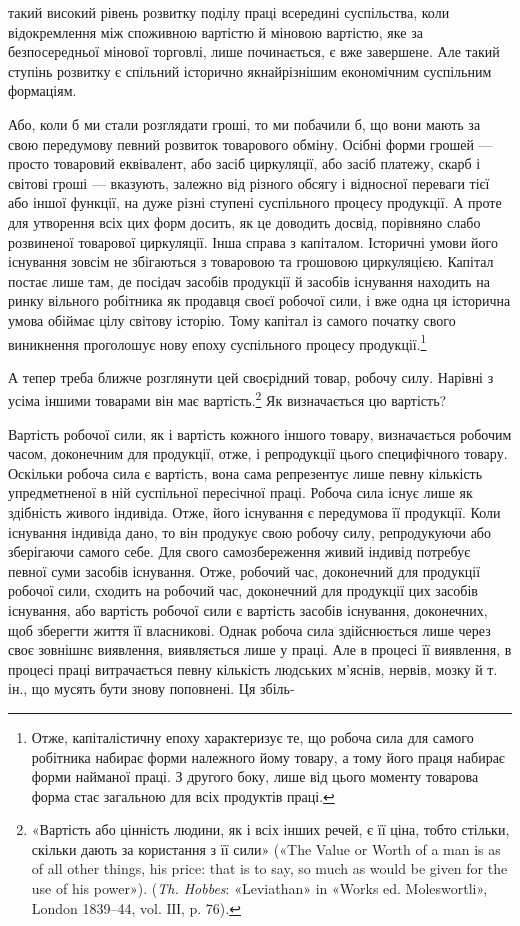 \parcont{}  %
такий високий рівень розвитку поділу праці всередині суспільства,
коли відокремлення між споживною вартістю й міновою
вартістю, яке за безпосередньої мінової торговлі, лише починається,
є вже завершене. Але такий ступінь розвитку є спільний
історично якнайрізнішим економічним суспільним формаціям.

Або, коли б ми стали розглядати гроші, то ми побачили б,
що вони мають за свою передумову певний розвиток товарового
обміну. Осібні форми грошей — просто товаровий еквівалент,
або засіб циркуляції, або засіб платежу, скарб і світові гроші —
вказують, залежно від різного обсягу і відносної переваги тієї
або іншої функції, на дуже різні ступені суспільного процесу
продукції. А проте для утворення всіх цих форм досить, як це
доводить досвід, порівняно слабо розвиненої товарової циркуляції.
Інша справа з капіталом. Історичні умови його існування зовсім
не збігаються з товаровою та грошовою циркуляцією. Капітал
постає лише там, де посідач засобів продукції й засобів існування
находить на ринку вільного робітника як продавця своєї робочої
сили, і вже одна ця історична умова обіймає цілу світову історію.
Тому капітал із самого початку свого виникнення проголошує
нову епоху суспільного процесу продукції.\footnote{
Отже, капіталістичну епоху характеризує те, що робоча сила для
самого робітника набирає форми належного йому товару, а тому його
праця набирає форми найманої праці. З другого боку, лише від цього моменту
товарова форма стає загальною для всіх продуктів праці.
}

А тепер треба ближче розглянути цей своєрідний товар, робочу
силу. Нарівні з усіма іншими товарами він має вартість.\footnote{
«Вартість або цінність людини, як і всіх інших речей, є її ціна,
тобто стільки, скільки дають за користання з її сили» («The Value or
Worth of a man is as of all other things, his price: that is to say, so much
as would be given for the use of his power»). (\emph{Th. Hobbes}: «Leviathan»
in «Works ed. Moleswortli», London 1839--44, vol. IІІ, p. 76).
} Як
визначається цю вартість?

Вартість робочої сили, як і вартість кожного іншого товару,
визначається робочим часом, доконечним для продукції, отже,
і репродукції цього специфічного товару. Оскільки робоча сила
є вартість, вона сама репрезентує лише певну кількість упредметненої
в ній суспільної пересічної праці. Робоча сила існує
лише як здібність живого індивіда. Отже, його існування є передумова
її продукції. Коли існування індивіда дано, то він продукує
свою робочу силу, репродукуючи або зберігаючи самого себе.
Для свого самозбереження живий індивід потребує певної суми
засобів існування. Отже, робочий час, доконечний для продукції
робочої сили, сходить на робочий час, доконечний для продукції
цих засобів існування, або вартість робочої сили є вартість засобів
існування, доконечних, щоб зберегти життя її власникові.
Однак робоча сила здійснюється лише через своє зовнішнє виявлення,
виявляється лише у праці. Але в процесі її виявлення,
в процесі праці витрачається певну кількість людських м’яснів,
нервів, мозку й т. ін., що мусять бути знову поповнені. Ця збіль-
\parbreak{}  %
